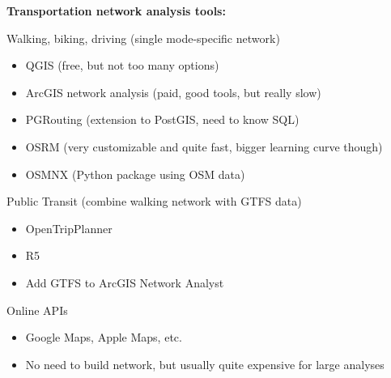 \documentclass[aspectratio=169]{beamer}
\begin{document}
\begin{frame}
	
	\textbf{Transportation network analysis tools:}
	
	\vspace{2mm}
	
	Walking, biking, driving (single mode-specific network)
	\begin{itemize}
		\item QGIS (free, but not too many options)
		\item ArcGIS network analysis (paid, good tools, but really slow)
		\item PGRouting (extension to PostGIS, need to know SQL)
		\item OSRM (very customizable and quite fast, bigger learning curve though)
		\item OSMNX (Python package using OSM data)
	\end{itemize}
	
	Public Transit (combine walking network with GTFS data)
	\begin{itemize}
		\item OpenTripPlanner
		\item R5
		\item Add GTFS to ArcGIS Network Analyst
	\end{itemize}

	Online APIs
	\begin{itemize}
		\item Google Maps, Apple Maps, etc.
		\item No need to build network, but usually quite expensive for large analyses
	\end{itemize}
	
	
\end{frame}
\end{document}
